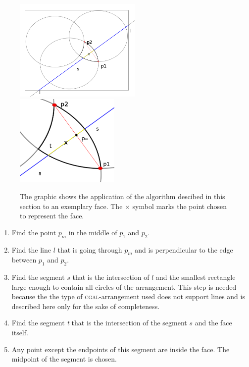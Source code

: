\documentclass[a4paper,12pt]{article}
\begin{document}
\begin{figure}[hb]
\includegraphics[width=0.55\textwidth]{pictures/PointInFace3.png}
\includegraphics[width=0.45\textwidth]{pictures/PointInFace4.png}
 \caption[Close up of \textit{Hemidactylus} sp.]
   {The graphic shows the application of the algorithm descibed in this section to an exemplary face. The $\times$ symbol marks the point chosen to represent the face.}
\end{figure}
\begin {enumerate}
\item
Find the point $p_m$ in the middle of $p_1$ and $p_2$.
\item
Find the line $l$ that is going through $p_m$ and is perpendicular to the edge between $p_1$ and $p_2$.
\item
Find the segment $s$ that is the intersection of $l$ and the smallest rectangle large enough to contain all circles of the arrangement. This step is needed because the the type of \textsc{cgal}-arrangement used does not support lines and is described here only for the sake of completeness.
\item
Find the segment \emph{t} that is the intersection of the segment $s$ and the face itself.
\item
Any point except the endpoints of this segment are inside the face. The midpoint of the segment is chosen.
\end{enumerate}
\end{document}
